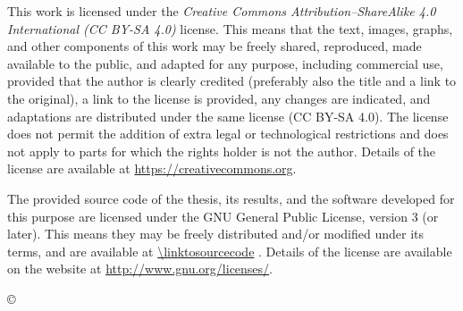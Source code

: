 \thispagestyle{empty}
\vspace*{\fill}
{\noindent\footnotesize


\vspace*{5cm}
{\small \noindent
This work is licensed under the \textit{Creative Commons Attribution–ShareAlike 4.0 International (CC BY-SA 4.0)} license.
This means that the text, images, graphs, and other components of this work may be freely shared, reproduced, made available to the public, and adapted for any purpose, including commercial use, provided that the author is clearly credited (preferably also the title and a link to the original), a link to the license is provided, any changes are indicated, and adaptations are distributed under the same license (CC BY-SA 4.0). The license does not permit the addition of extra legal or technological restrictions and does not apply to parts for which the rights holder is not the author.
Details of the license are available at \url{https://creativecommons.org}.

\begin{center}%
\hspace*{1ex}\hspace*{1ex}%
\end{center}
}

\ifCODEPUBLISHED
\vspace*{1.5cm}
{\small \noindent
The provided source code of the thesis, its results, and the software developed for this purpose are licensed under the GNU General Public License, version 3 (or later). This means they may be freely distributed and/or modified under its terms, and are available at \url{\linktosourcecode} . Details of the license are available on the website at \url{http://www.gnu.org/licenses/}.
}
\fi
   
}
\begin{center}
{\footnotesize{\sc \copyright \myyear\ \tauthor}}
\end{center} 